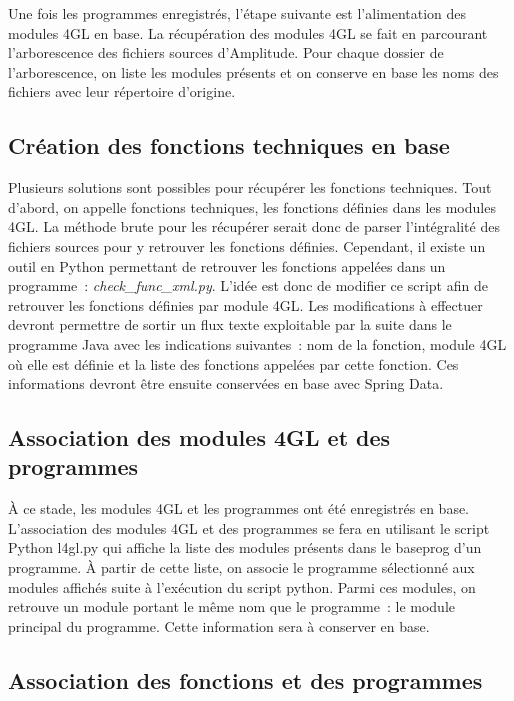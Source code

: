 \documentclass{polytech/polytech}
\begin{document}
Une fois les programmes enregistrés, l’étape suivante est l’alimentation des modules 4GL en base. La récupération des modules 4GL se fait en parcourant l’arborescence des fichiers sources d’Amplitude. Pour chaque dossier de l’arborescence, on liste les modules présents et on conserve en base les noms des fichiers avec leur répertoire d’origine. 


\subsection{Création des fonctions techniques en base}


Plusieurs solutions sont possibles pour récupérer les fonctions techniques. Tout d’abord, on appelle fonctions techniques, les fonctions définies dans les modules 4GL. La méthode brute pour les récupérer serait donc de parser l’intégralité des fichiers sources pour y retrouver les fonctions définies. Cependant, il existe un outil en Python permettant de retrouver les fonctions appelées dans un programme : \textit{check\_func\_xml.py}. L’idée est donc de modifier ce script afin de retrouver les fonctions définies par module 4GL. Les modifications à effectuer devront permettre de sortir un flux texte exploitable par la suite dans le programme Java avec les indications suivantes : nom de la fonction, module 4GL où elle est définie et la liste des fonctions appelées par cette fonction. Ces informations devront être ensuite conservées en base avec Spring Data. 


\subsection{Association des modules 4GL et des programmes}

À ce stade, les modules 4GL et les programmes ont été enregistrés en base. L’association des modules 4GL et des programmes se fera en utilisant le script Python l4gl.py qui affiche la liste des modules présents dans le baseprog d’un programme. À partir de cette liste, on associe le programme sélectionné aux modules affichés suite à l’exécution du script python. Parmi ces modules, on retrouve un module portant le même nom que le programme : le module principal du programme. Cette information sera à conserver en base. 


\subsection{Association des fonctions et des programmes}
\end{document}
